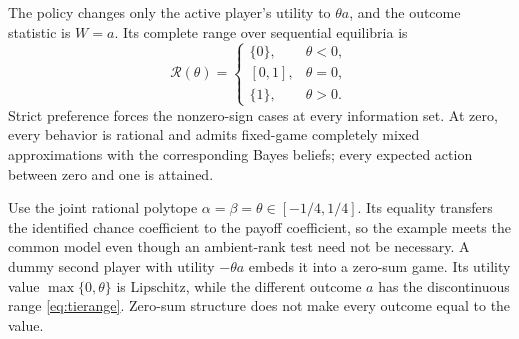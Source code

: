 \documentclass[11pt,a4paper]{article}
\numberwithin{equation}{section}
\theoremstyle{definition}
\begin{document}
The policy changes only the active player's utility to \(\theta a\),
and the outcome statistic is \(W=a\). Its complete range over
sequential equilibria is
\begin{equation}\label{eq:tierange}
 \mathcal R(\theta)=
 \begin{cases}
  \{0\},&\theta<0,\\
  [0,1],&\theta=0,\\
  \{1\},&\theta>0.
 \end{cases}
\end{equation}
Strict preference forces the nonzero-sign cases at every information
set. At zero, every behavior is rational and admits fixed-game
completely mixed approximations with the corresponding Bayes beliefs;
every expected action between zero and one is attained.

Use the joint rational polytope
\(\alpha=\beta=\theta\in[-1/4,1/4]\).
Its equality transfers the identified chance coefficient to the
payoff coefficient, so the example meets the common model even though
an ambient-rank test need not be necessary. A dummy second player
with utility \(-\theta a\) embeds it into a zero-sum game.
Its utility value \(\max\{0,\theta\}\) is Lipschitz, while the
different outcome \(a\) has the discontinuous range
\eqref{eq:tierange}. Zero-sum structure does not make every outcome
equal to the value.
\end{document}
